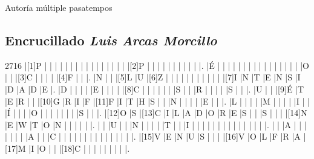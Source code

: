 \Titular*%
{Pasatempos}%
{Autoría múltiple}%
{pasatempos}%
{}%

\begin{refsection}
\vspace*{-6mm}
\section*{\textcolor{Resalte}{Encrucillado } {\normalfont \itshape Luis Arcas Morcillo}}%

\begin{Puzzle}{27}{16}
|[1]P  |{}    |{}    |{}    |{}    |{}    |{}    |{}    |{}    |{}    |{}    |{}    |{}    |{}    |{}    |{}    |{}    |[2]P  |{}    |{}    |{}    |{}    |{}    |{}    |{}    |{}    |{}   |{} |.
|É     |{}    |{}    |{}    |{}    |{}    |{}    |{}    |{}    |{}    |{}    |{}    |{}    |{}    |{}    |{}    |{}    |O     |{}    |{}    |[3]C  |{}    |{}    |{}    |{}    |[4]F  |{}   |{} |.
|N     |{}    |{}    |[5]L  |U     |[6]Z  |{}    |{}    |{}    |{}    |{}    |{}    |{}    |{}    |{}    |{}    |{}    |[7]I  |N     |T     |E     |N     |S     |I     |D     |A     |D    |E  |.
|D     |{}    |{}    |{}    |{}    |E     |{}    |{}    |{}    |{}    |[8]C  |{}    |{}    |{}    |{}    |{}    |{}    |S     |{}    |{}    |R     |{}    |{}    |{}    |{}    |S     |{}   |{} |.
|U     |{}    |{}    |[9]É  |T     |E     |R     |{}    |{}    |[10]G |R     |I     |F     |[11]F |I     |T     |H     |S     |{}    |{}    |N     |{}    |{}    |{}    |{}    |E     |{}   |{} |.
|L     |{}    |{}    |{}    |{}    |M     |{}    |{}    |{}    |{}    |I     |{}    |{}    |Í     |{}    |{}    |{}    |O     |{}    |{}    |{}    |{}    |{}    |{}    |{}    |S     |{}   |{} |.
|[12]O |S     |[13]C |I     |L     |A     |D     |O     |R     |E     |S     |{}    |{}    |S     |{}    |{}    |{}    |[14]N |E     |W     |T     |O     |N     |{}    |{}    |{}    |{}   |{} |.
|{}    |{}    |U     |{}    |{}    |N     |{}    |{}    |{}    |{}    |T     |{}    |{}    |I     |{}    |{}    |{}    |{}    |{}    |{}    |{}    |{}    |{}    |{}    |{}    |{}    |{}   |{} |.
|{}    |{}    |A     |{}    |{}    |{}    |{}    |{}    |{}    |{}    |A     |{}    |{}    |C     |{}    |{}    |{}    |{}    |{}    |{}    |{}    |{}    |{}    |{}    |{}    |{}    |{}   |{} |.
|[15]V |E     |N     |U     |S     |{}    |{}    |{}    |[16]V |O     |L     |F     |R     |A     |[17]M |I     |O     |{}    |{}    |[18]C |{}    |{}    |{}    |{}    |{}    |{}    |{}   |{} |.

\end{Puzzle}
\end{refsection}
